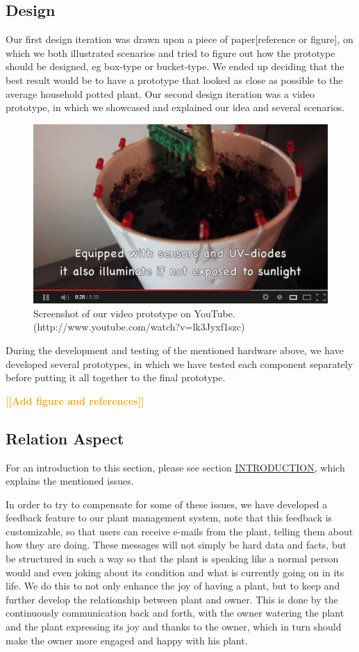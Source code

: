 \documentclass{ubicomp2012}
\newcommand{\todo}[1]{\textsf{\textbf{\textcolor{Orange}{[[#1]]}}}}
\begin{document}
\subsection{Design}
Our first design iteration was drawn upon a piece of paper[reference or figure], on which we both illustrated scenarios and tried to figure out how the prototype should be designed, eg box-type or bucket-type. We ended up deciding that the best result would be to have a prototype that looked as close as possible to the average household potted plant.
Our second design iteration was a video prototype, in which we showcased and explained our idea and several scenarios.
\begin{figure}[h!]
\centering
\includegraphics[width=\columnwidth]{iPlant_youtube.png}
\caption{Screenshot of our video prototype on YouTube. (http://www.youtube.com/watch?v=lk3Jyxf1szc)}
\label{fig:iPlant_youtube}
\end{figure}
During the development and testing of the mentioned hardware above, we have developed several prototypes, in which we have tested each component separately before putting it all together to the final prototype.

\todo{Add figure and references}

\subsection{Relation Aspect}
For an introduction to this section, please see section \hyperlink{introduction}{INTRODUCTION}, which explains the mentioned issues.

In order to try to compensate for some of these issues, we have developed a feedback feature to our plant management system, note that this feedback is customizable, so that users can receive e-mails from the plant, telling them about how they are doing. These messages will not simply be hard data and facts, but be structured in such a way so that the plant is speaking like a normal person would and even joking about its condition and what is currently going on in its life.
We do this to not only enhance the joy of having a plant, but to keep and further develop the relationship between plant and owner. This is done by the continuously communication back and forth, with the owner watering the plant and the plant expressing its joy and thanks to the owner, which in turn should make the owner more engaged and happy with his plant.
\end{document}
